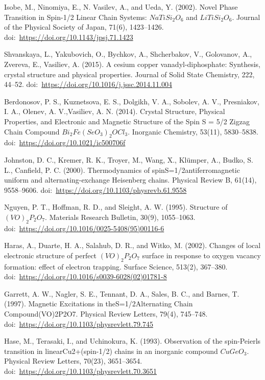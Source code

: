 \documentclass[11pt]{article}
\begin{document}
\begin{thebibliography}{3}
Isobe, M., Ninomiya, E., N. Vasilev, A., and Ueda, Y. (2002). Novel Phase Transition in Spin-1/2 Linear Chain Systems: $NaTiSi_2O_6$ and $LiTiSi_2O_6$. Journal of the Physical Society of Japan, 71(6), 1423–1426. doi:~\url{https://doi.org/10.1143/jpsj.71.1423}

Shvanskaya, L., Yakubovich, O., Bychkov, A., Shcherbakov, V., Golovanov, A., Zvereva, E., Vasiliev, A. (2015). A cesium copper vanadyl-diphosphate: Synthesis, crystal structure and physical properties. Journal of Solid State Chemistry, 222, 44–52. doi:~\url{https://doi.org/10.1016/j.jssc.2014.11.004} 

Berdonosov, P. S., Kuznetsova, E. S., Dolgikh, V. A., Sobolev, A. V., Presniakov, I. A., Olenev, A. V.,Vasiliev, A. N. (2014). Crystal Structure, Physical Properties, and Electronic and Magnetic Structure of the Spin S = 5/2 Zigzag Chain Compound $Bi_2Fe(SeO_3)_2OCl_3$. Inorganic Chemistry, 53(11), 5830–5838. doi:~\url{https://doi.org/10.1021/ic500706f} 

Johnston, D. C., Kremer, R. K., Troyer, M., Wang, X., Klümper, A., Budko, S. L., Canfield, P. C. (2000). Thermodynamics of spinS=1/2antiferromagnetic uniform and alternating-exchange Heisenberg chains. Physical Review B, 61(14), 9558–9606. doi:~\url{https://doi.org/10.1103/physrevb.61.9558}

Nguyen, P. T., Hoffman, R. D., and Sleight, A. W. (1995). Structure of $(VO)_2P_2O_7$. Materials Research Bulletin, 30(9), 1055–1063. doi:~\url{https://doi.org/10.1016/0025-5408(95)00116-6} 

Haras, A., Duarte, H. A., Salahub, D. R., and Witko, M. (2002). Changes of local electronic structure of perfect $(VO)_2P_2O_7$ surface in response to oxygen vacancy formation: effect of electron trapping. Surface Science, 513(2), 367–380. doi:~\url{https://doi.org/10.1016/s0039-6028(02)01781-8}

Garrett, A. W., Nagler, S. E., Tennant, D. A., Sales, B. C., and Barnes, T. (1997). Magnetic Excitations in theS=1/2Alternating Chain Compound(VO)2P2O7. Physical Review Letters, 79(4), 745–748. doi:~\url{https://doi.org/10.1103/physrevlett.79.745} 

Hase, M., Terasaki, I., and Uchinokura, K. (1993). Observation of the spin-Peierls transition in linearCu2+(spin-1/2) chains in an inorganic compound $CuGeO_3$. Physical Review Letters, 70(23), 3651–3654. doi:~\url{https://doi.org/10.1103/physrevlett.70.3651} 


\end{thebibliography}
\end{document}
